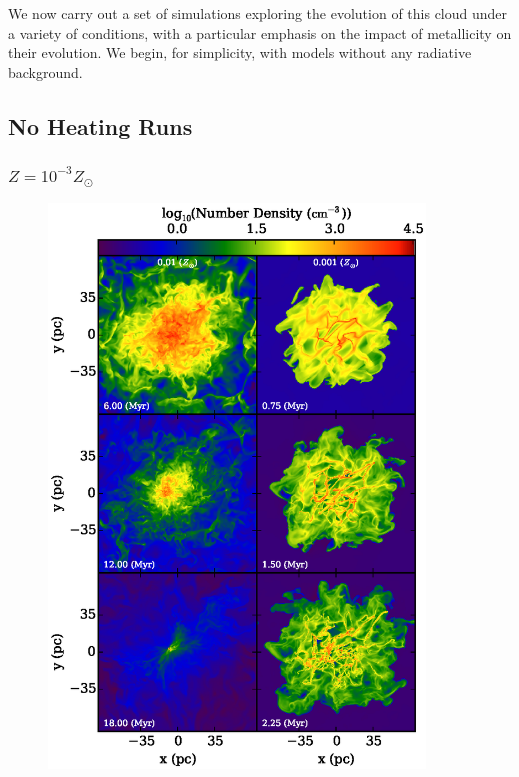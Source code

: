 \documentclass[useAMS,usenatbib]{mn2e}
\begin{document}
We now carry out a set of simulations exploring the evolution of this cloud under a variety of conditions, with a particular emphasis on the impact of metallicity on their evolution.  We begin, for simplicity, with models without any radiative background.


\subsection{No Heating Runs}

\subsubsection{$Z=10^{-3}Z_\odot$}

\begin{figure}
\begin{center}
\hspace{-1.2cm}
\includegraphics[width=10cm]{Images/slice_number_density_panel} \hspace{-1.5cm}

\end{center}
\end{figure}
\end{document}
